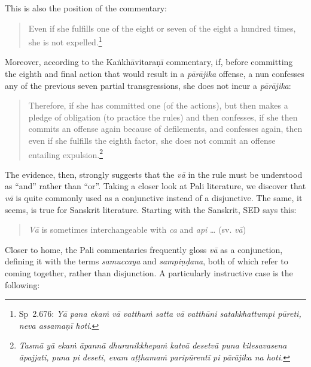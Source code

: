 \documentclass[12pt,openany]{book}%
\begin{document}
This is also the position of the commentary:

\begin{quotation}%
Even if she fulfills one of the eight or seven of the eight a hundred times, she is not expelled.\footnote{Sp 2.676: \textit{\textsanskrit{Yā} pana \textsanskrit{ekaṁ} \textsanskrit{vā} \textsanskrit{vatthuṁ} satta \textsanskrit{vā} \textsanskrit{vatthūni} satakkhattumpi \textsanskrit{pūreti}, neva \textsanskrit{assamaṇī} hoti}. }

%
\end{quotation}

Moreover, according to the \textsanskrit{Kaṅkhāvitaraṇī} commentary, if, before committing the eighth and final action that would result in a \textit{\textsanskrit{pārājika}} offense, a nun confesses any of the previous seven partial transgressions, she does not incur a \textit{\textsanskrit{pārājika}}:

\begin{quotation}%
Therefore, if she has committed one (of the actions), but then makes a pledge of obligation (to practice the rules) and then confesses, if she then commits an offense again because of defilements, and confesses again, then even if she fulfills the eighth factor, she does not commit an offense entailing expulsion.\footnote{\textit{\textsanskrit{Tasmā} \textsanskrit{yā} \textsanskrit{ekaṁ} \textsanskrit{āpannā} \textsanskrit{dhuranikkhepaṁ} \textsanskrit{katvā} \textsanskrit{desetvā} puna kilesavasena \textsanskrit{āpajjati}, puna pi deseti, evam \textsanskrit{aṭṭhamaṁ} \textsanskrit{paripūrentī} pi \textsanskrit{pārājika} na hoti.} }

%
\end{quotation}

The evidence, then, strongly suggests that the \textit{\textsanskrit{vā}} in the rule must be understood as “and” rather than “or”. Taking a closer look at Pali literature, we discover that \textit{\textsanskrit{vā}} is quite commonly used as a conjunctive instead of a disjunctive. The same, it seems, is true for Sanskrit literature. Starting with the Sanskrit, SED says this:

\begin{quotation}%
\textit{\textsanskrit{Vā}} is sometimes interchangeable with \textit{ca} and \textit{api} … (sv. \textit{\textsanskrit{vā}})

%
\end{quotation}

Closer to home, the Pali commentaries frequently gloss \textit{\textsanskrit{vā}} as a conjunction, defining it with the terms \textit{samuccaya} and \textit{\textsanskrit{sampiṇḍana}}, both of which refer to coming together, rather than disjunction. A particularly instructive case is the following:
\end{document}
